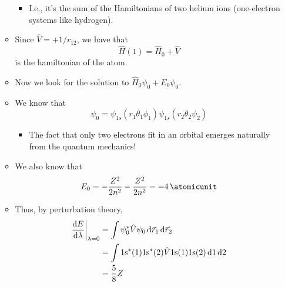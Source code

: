 \documentclass[../notes.tex]{subfiles}
\begin{document}
\begin{itemize}
\begin{itemize}
        \begin{itemize}
            \item I.e., it's the sum of the Hamiltonians of two helium ions (one-electron systems like hydrogen).
        \end{itemize}
        \item Since $\hat{V}=+1/r_{12}$, we have that
        \begin{equation*}
            \hat{H}(1) = \hat{H}_0+\hat{V}
        \end{equation*}
        is the hamiltonian of the atom.
        \item Now we look for the solution to $\hat{H}_0\psi_0+E_0\psi_0$.
        \item We know that
        \begin{equation*}
            \psi_0 = \psi_{1s}(r_1\theta_1\phi_1)\psi_{1s}(r_2\theta_2\psi_2)
        \end{equation*}
        \begin{itemize}
            \item The fact that only two electrons fit in an orbital emerges naturally from the quantum mechanics!
        \end{itemize}
        \item We also know that
        \begin{equation*}
            E_0 = -\frac{Z^2}{2n^2}-\frac{Z^2}{2n^2} = -\SI{4}{\atomicunit}
        \end{equation*}
        \item Thus, by perturbation theory,
        \begin{align*}
            \dv{E}{\lambda}\bigg|_{\lambda=0} &= \int\psi_0^*\hat{V}\psi_0\dd{\vec{r}_1}\dd{\vec{r}_2}\\
            &= \int\text{1s}^*(1)\text{1s}^*(2)\hat{V}\text{1s}(1)\text{1s}(2)\dd{1}\dd{2}\\
            &= \frac{5}{8}Z
        \end{align*}
    \end{itemize}
\end{itemize}
\end{document}
